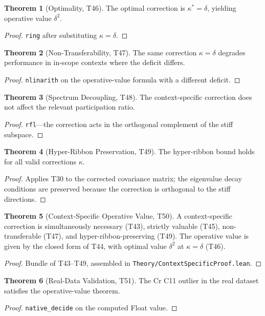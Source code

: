 \documentclass[11pt,a4paper]{article}
\theoremstyle{definition}
\newtheorem{theorem}{Theorem}[section]
\theoremstyle{plain}
\begin{document}
\begin{theorem}[Optimality, T46]
\label{thm:optimal}
The optimal correction is $\kappa^* = \delta$, yielding operative value $\delta^2$.
\end{theorem}
\begin{proof}
\texttt{ring} after substituting $\kappa = \delta$.
\end{proof}

\begin{theorem}[Non-Transferability, T47]
\label{thm:nontransfer}
The same correction $\kappa = \delta$ degrades performance in in-scope contexts where the deficit differs.
\end{theorem}
\begin{proof}
\texttt{nlinarith} on the operative-value formula with a different deficit.
\end{proof}

\begin{theorem}[Spectrum Decoupling, T48]
\label{thm:decoupled}
The context-specific correction does not affect the relevant participation ratio.
\end{theorem}
\begin{proof}
\texttt{rfl}---the correction acts in the orthogonal complement of the stiff subspace.
\end{proof}

\begin{theorem}[Hyper-Ribbon Preservation, T49]
\label{thm:preserves}
The hyper-ribbon bound holds for all valid corrections $\kappa$.
\end{theorem}
\begin{proof}
Applies T30 to the corrected covariance matrix; the eigenvalue decay conditions are preserved because the correction is orthogonal to the stiff directions.
\end{proof}

\begin{theorem}[Context-Specific Operative Value, T50]
\label{thm:csot}
A context-specific correction is simultaneously necessary (T43), strictly valuable (T45), non-transferable (T47), and hyper-ribbon-preserving (T49). The operative value is given by the closed form of T44, with optimal value $\delta^2$ at $\kappa = \delta$ (T46).
\end{theorem}
\begin{proof}
Bundle of T43--T49, assembled in \texttt{Theory/ContextSpecificProof.lean}.
\end{proof}

\begin{theorem}[Real-Data Validation, T51]
\label{thm:cr}
The Cr C11 outlier in the real dataset satisfies the operative-value theorem.
\end{theorem}
\begin{proof}
\texttt{native\_decide} on the computed Float value.
\end{proof}
\end{document}
